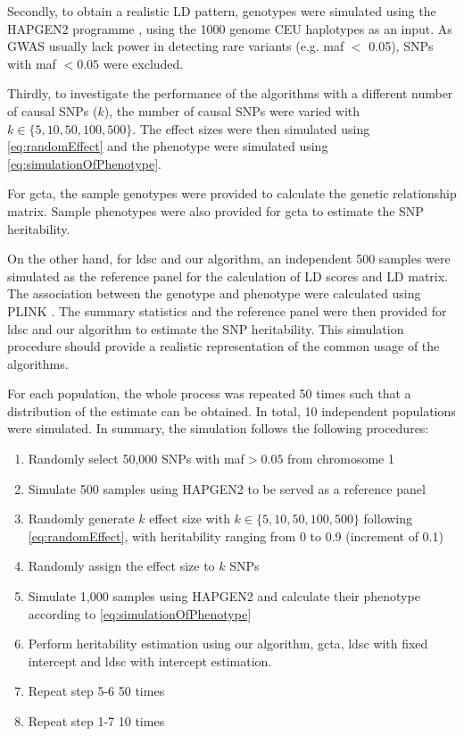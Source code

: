 
			Secondly, to obtain a realistic \gls{LD} pattern, genotypes were simulated using the HAPGEN2 programme \citep{Su2011}, using the 1000 genome \gls{CEU} haplotypes as an input.
			As \gls{GWAS} usually lack power in detecting rare variants (e.g. \gls{maf} $<$ 0.05), \glspl{SNP} with \gls{maf} $<0.05$ were excluded.
			
			Thirdly, to investigate the performance of the algorithms with a different number of causal \glspl{SNP} ($k$), the number of causal \glspl{SNP} were varied with $k\in\{5, 10, 50, 100, 500\}$.
			The effect sizes were then simulated using \cref{eq:randomEffect} and the phenotype were simulated using \cref{eq:simulationOfPhenotype}.
			
			For \gls{gcta}, the sample genotypes were provided to calculate the genetic relationship matrix. 
			Sample phenotypes were also provided for \gls{gcta} to estimate the \gls{SNP} heritability.
			
			On the other hand, for \gls{ldsc} and our algorithm, an independent 500 samples were simulated as the reference panel for the calculation of \gls{LD} scores and \gls{LD} matrix. 
			The association between the genotype and phenotype were calculated using PLINK \citep{Purcell2007}.
			The summary statistics and the reference panel were then provided for \gls{ldsc} and our algorithm to estimate the \gls{SNP} heritability.
			This simulation procedure should provide a realistic representation of the common usage of the algorithms.
			
			For each population, the whole process was repeated 50 times such that a distribution of the estimate can be obtained. 
			In total, 10 independent populations were simulated.
			In summary, the simulation follows the following procedures:
			\begin{enumerate}
				\item Randomly select 50,000 \glspl{SNP} with \gls{maf}$>0.05$ from chromosome 1
				\item Simulate 500 samples using HAPGEN2 to be served as a reference panel
				\item Randomly generate $k$ effect size with $k \in \{5,10,50,100,500\}$ following \cref{eq:randomEffect}, with heritability ranging from 0 to 0.9 (increment of 0.1)
				\item Randomly assign the effect size to $k$ \glspl{SNP}
				\item Simulate 1,000 samples using HAPGEN2 and calculate their phenotype according to \cref{eq:simulationOfPhenotype}
				\item Perform heritability estimation using our algorithm, \gls{gcta}, \gls{ldsc} with fixed intercept and \gls{ldsc} with intercept estimation.
				\item Repeat step 5-6 50 times
				\item Repeat step 1-7 10 times
			\end{enumerate}
		
